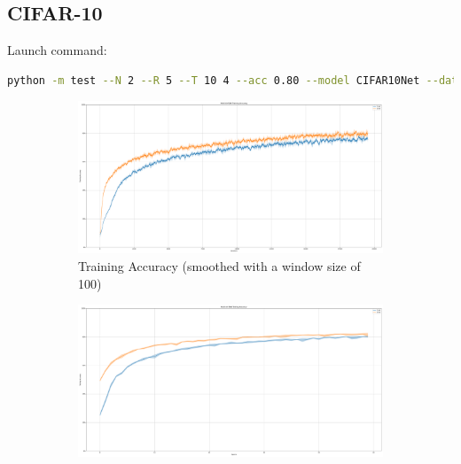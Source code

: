     \subsection{CIFAR-10}
    \label{appendix:energy_tradeoff_cifar10}
        Launch command: 
        \begin{lstlisting}[language=Bash, basicstyle=\small, breaklines=true]
python -m test --N 2 --R 5 --T 10 4 --acc 0.80 --model CIFAR10Net --data-path /scratch/zyi/codeSpace/data --dataset CIFAR10 --batch-size 128 --opt adam --lr 1e-5 --lr-scheduler none --epochs 50 --lr-warmup-epochs 0 --output-dir /scratch/zyi/codeSpace/MultibitSpikes/timesteps
        \end{lstlisting}

        \begin{figure}[H]
            \centering
            \begin{subfigure}[H]{0.48\textwidth}
                \includegraphics[width=\textwidth]{../timesteps/CIFAR10/plots/cifar10_train_acc.pdf}
                \caption{Training Accuracy (smoothed with a window size of 100)}
            \end{subfigure}
            \hfill
            \begin{subfigure}[H]{0.48\textwidth}
                \includegraphics[width=\textwidth]{../timesteps/CIFAR10/plots/cifar10_test_acc.pdf}

\end{subfigure}
\end{figure}
